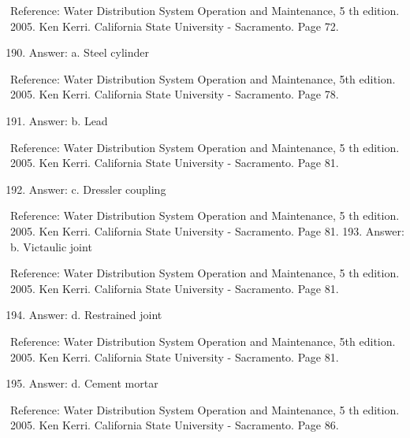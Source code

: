\documentclass[10pt]{article}
\begin{document}
Reference: Water Distribution System Operation and Maintenance, 5 th edition. 2005. Ken Kerri. California State University - Sacramento. Page 72.

\begin{enumerate}
  \setcounter{enumi}{189}
  \item Answer: a. Steel cylinder
\end{enumerate}

Reference: Water Distribution System Operation and Maintenance, 5th edition. 2005. Ken Kerri. California State University - Sacramento. Page 78.

\begin{enumerate}
  \setcounter{enumi}{190}
  \item Answer: b. Lead
\end{enumerate}

Reference: Water Distribution System Operation and Maintenance, 5 th edition. 2005. Ken Kerri. California State University - Sacramento. Page 81.

\begin{enumerate}
  \setcounter{enumi}{191}
  \item Answer: c. Dressler coupling
\end{enumerate}

Reference: Water Distribution System Operation and Maintenance, 5 th edition. 2005. Ken Kerri. California State University - Sacramento. Page 81. 193. Answer: b. Victaulic joint

Reference: Water Distribution System Operation and Maintenance, 5 th edition. 2005. Ken Kerri. California State University - Sacramento. Page 81.

\begin{enumerate}
  \setcounter{enumi}{193}
  \item Answer: d. Restrained joint
\end{enumerate}

Reference: Water Distribution System Operation and Maintenance, 5th edition. 2005. Ken Kerri. California State University - Sacramento. Page 81.

\begin{enumerate}
  \setcounter{enumi}{194}
  \item Answer: d. Cement mortar
\end{enumerate}

Reference: Water Distribution System Operation and Maintenance, 5 th edition. 2005. Ken Kerri. California State University - Sacramento. Page 86.
\end{document}
